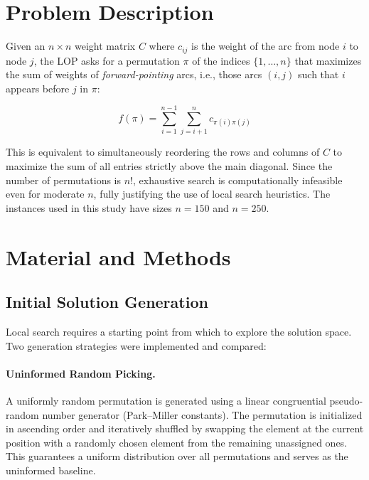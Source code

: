 \documentclass[11pt, a4paper]{article}
\begin{document}
\section{Problem Description}
\label{sec:problem}

Given an $n \times n$ weight matrix $C$ where $c_{ij}$ is the weight of the arc from node $i$ to node $j$, the LOP asks for a permutation $\pi$ of the indices $\{1, \dots, n\}$ that maximizes the sum of weights of \emph{forward-pointing} arcs, i.e., those arcs $(i, j)$ such that $i$ appears before $j$ in $\pi$:

\begin{equation}
    f(\pi) = \sum_{i=1}^{n-1} \sum_{j=i+1}^{n} c_{\pi(i)\pi(j)}
\end{equation}

This is equivalent to simultaneously reordering the rows and columns of $C$ to maximize the sum of all entries strictly above the main diagonal. Since the number of permutations is $n!$, exhaustive search is computationally infeasible even for moderate $n$, fully justifying the use of local search heuristics. The instances used in this study have sizes $n = 150$ and $n = 250$.

\section{Material and Methods}
\label{sec:methods}

\subsection{Initial Solution Generation}

Local search requires a starting point from which to explore the solution space. Two generation strategies were implemented and compared:

\paragraph{Uninformed Random Picking.} A uniformly random permutation is generated using a linear congruential pseudo-random number generator (Park--Miller constants). The permutation is initialized in ascending order and iteratively shuffled by swapping the element at the current position with a randomly chosen element from the remaining unassigned ones. This guarantees a uniform distribution over all permutations and serves as the uninformed baseline.
\end{document}
